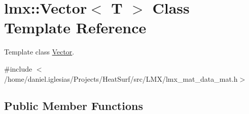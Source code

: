 \hypertarget{classlmx_1_1Vector}{\section{lmx\-:\-:Vector$<$ T $>$ Class Template Reference}
\label{classlmx_1_1Vector}
}


Template class \hyperlink{classlmx_1_1Vector}{Vector}.  




{\ttfamily \#include $<$/home/daniel.\-iglesias/\-Projects/\-Heat\-Surf/src/\-L\-M\-X/lmx\-\_\-mat\-\_\-data\-\_\-mat.\-h$>$}

\subsection*{Public Member Functions}
